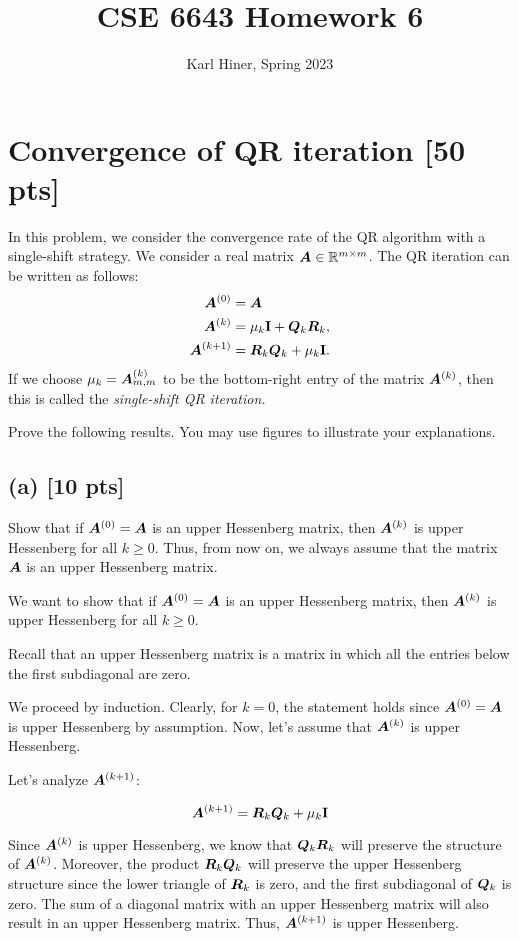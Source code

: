 \documentclass[twoside,10pt]{article}
\begin{document}
\title{CSE 6643 Homework 6}
\author{Karl Hiner, Spring 2023}
\date{}
\maketitle

\section{Convergence of QR iteration [50 pts]}
  In this problem, we consider the convergence rate of the QR algorithm with a single-shift strategy. We consider a real matrix $\bm{A} \in \mathbb{R}^{m \times m}$. 
  The QR iteration can be written as follows:
  \begin{align}
    \bm{A}^{(0)} &= \bm{A} \\
    \bm{A}^{(k)} &= \mu_k \mathbf{I} + \bm{Q}_k \bm{R}_k,\\
    \bm{A}^{(k+1)} &= \bm{R}_k \bm{Q}_k + \mu_k \mathbf{I}.
  \end{align}
  If we choose $\mu_k = \bm{A}_{m, m}^{(k)}$ to be the bottom-right entry of the matrix $\bm{A}^{(k)}$, then this is called the \emph{single-shift QR iteration.}

  Prove the following results.
  You may use figures to illustrate your explanations. 
  \subsection*{(a) [10 pts]}
  Show that if $\bm{A}^{(0)} = \bm{A}$ is an upper Hessenberg matrix, then $\bm{A}^{(k)}$ is upper Hessenberg for all $k \geq 0$.
  Thus, from now on, we always assume that the matrix $\bm{A}$ is an upper Hessenberg matrix.


\quad We want to show that if $\bm{A}^{(0)} = \bm{A}$ is an upper Hessenberg matrix, then $\bm{A}^{(k)}$ is upper Hessenberg for all $k \geq 0$.

Recall that an upper Hessenberg matrix is a matrix in which all the entries below the first subdiagonal are zero. 

We proceed by induction. Clearly, for $k = 0$, the statement holds since $\bm{A}^{(0)} = \bm{A}$ is upper Hessenberg by assumption. Now, let's assume that $\bm{A}^{(k)}$ is upper Hessenberg.

Let's analyze $\bm{A}^{(k+1)}$:

$$\bm{A}^{(k+1)} = \bm{R}_k \bm{Q}_k + \mu_k \mathbf{I}$$

Since $\bm{A}^{(k)}$ is upper Hessenberg, we know that $\bm{Q}_k \bm{R}_k$ will preserve the structure of $\bm{A}^{(k)}$. Moreover, the product $\bm{R}_k \bm{Q}_k$ will preserve the upper Hessenberg structure since the lower triangle of $\bm{R}_k$ is zero, and the first subdiagonal of $\bm{Q}_k$ is zero. The sum of a diagonal matrix with an upper Hessenberg matrix will also result in an upper Hessenberg matrix. Thus, $\bm{A}^{(k+1)}$ is upper Hessenberg.
\end{document}
